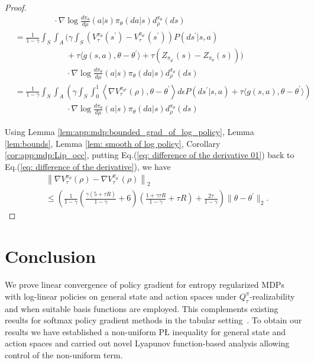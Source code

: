 \documentclass{amsart}
\theoremstyle{definition}
\begin{document}
\begin{proof}
\begin{align}
& \qquad \qquad \ \ \ \cdot\nabla \log \frac{d\pi_\theta}{d \mu}(a| s)\pi_{\theta}(da|s)d_\rho^{\pi_{\theta}}(ds)  \nonumber \\
& =  \frac{1}{1-\gamma}\int_{S} \int_{A} \bigg(\gamma \int_{S} \left(V^{\pi_\theta}_\tau (s^\prime) - V^{\pi_{\theta^\prime}}_\tau (s^\prime)\right)P(d s^\prime | s,a) \nonumber \\
& \quad \quad \qquad \qquad \ + \tau \langle g(s,a), \theta - \theta^\prime \rangle + \tau\left(Z_{\pi_{\theta^\prime}}(s) - Z_{\pi_\theta}(s)\right)\bigg) \nonumber\\
& \qquad \qquad \qquad \ \cdot\nabla \log \frac{d\pi_\theta}{d \mu}(a| s)\pi_{\theta}(da|s)d_\rho^{\pi_{\theta}}(ds) \nonumber\\
& =  \frac{1}{1-\gamma}\int_{S} \int_{A} \left(\gamma \int_{S}  \int_0^1 \left\langle \nabla V_\tau^{\pi_{\theta^\epsilon}}(\rho), \theta - \theta^\prime\right\rangle d \epsilon P(d s^\prime | s,a) + \tau \langle g(s,a), \theta - \theta^\prime \rangle \right) \nonumber\\
& \qquad \qquad \qquad \ \cdot\nabla \log \frac{d\pi_\theta}{d \mu}(a| s)\pi_{\theta}(da|s)d_\rho^{\pi_{\theta}}(ds) \label{eq: difference of the derivative 01} 
\end{align}

Using Lemma \ref{lem:app:mdp:bounded_grad_of_log_policy}, Lemma \ref{lem:bounds}, Lemma \ref{lem: smooth of log policy}, Corollary \ref{cor:app:mdp:Lip_occ}, putting Eq.(\ref{eq: difference of the derivative 01}) back to Eq.(\ref{eq: difference of the derivative}), we have 
\begin{align}
& \left\|\nabla V_\tau^{\pi_\theta}(\rho) - \nabla V_\tau^{\pi_{\theta^\prime}}(\rho)\right\|_2\\
& \leq \left( \frac{1}{1-\gamma}\left(\frac{ \gamma (5 + \tau R)  }{1-\gamma} + 6\right)\left(\frac{1+\gamma\tau R}{1-\gamma} + \tau R\right) + \frac{2\tau }{1-\gamma}\right) \Bigg\|\theta - \theta^\prime\Bigg\|_2.
\end{align}
\end{proof}

\section{Conclusion}

We prove linear convergence of policy gradient for entropy regularized MDPs with log-linear policies on general state and action spaces under $Q^\pi_\tau$-realizability and when suitable basis functions are employed. 
This complements existing results for softmax policy gradient methods in the tabular setting~\cite{mei2020global}.
To obtain our results we have established a non-uniform P{\L} inequality for general state and action spaces and carried out novel Lyapunov function-based analysis allowing control of the non-uniform term.   
\end{document}
